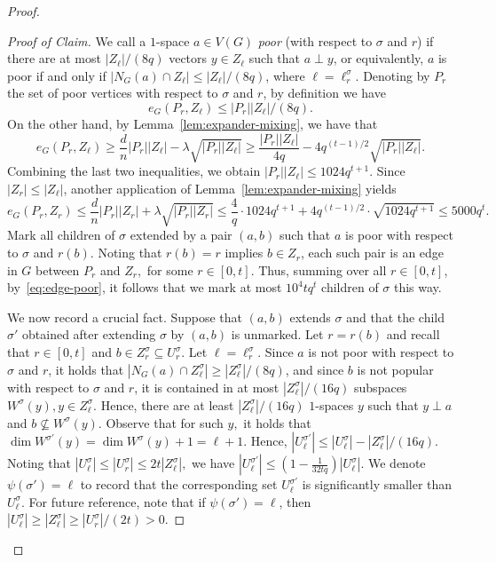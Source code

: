 \documentclass{article}
\theoremstyle{plain}
\theoremstyle{definition}
\begin{document}
\begin{proof}
\begin{proof}[Proof of Claim]
        We call a $1$-space $a \in V(G)$ \emph{poor} (with respect to $\sigma$ and $r$) if there are at most $|Z_\ell| / (8q)$ vectors $y \in Z_\ell$ such that $a \perp y$, or equivalently, $a$ is poor if and only if $|N_G(a) \cap Z_\ell | \le |Z_\ell| / (8q)$, where $\ell = \ell_r^\sigma$. Denoting by $P_r$ the set of poor vertices with respect to $\sigma$ and $r$, by definition we have 
        \begin{equation} \label{eq:eG_P_Zell}
            e_G(P_r, Z_\ell) \le |P_r| |Z_\ell| / (8q).
        \end{equation}
        On the other hand, by Lemma~\ref{lem:expander-mixing}, we have that
        \[ e_G(P_r, Z_\ell) \ge \frac{d}{n} |P_r||Z_\ell| - \lambda \sqrt{ |P_r| |Z_\ell|} \ge \frac{|P_r||Z_\ell|}{4q} - 4q^{(t-1)/2} \sqrt{|P_r||Z_\ell|} . \]
        Combining the last two inequalities, we obtain $|P_r||Z_\ell| \le 1024 q^{t+1}$. Since $|Z_r| \le |Z_\ell|$, another application of Lemma~\ref{lem:expander-mixing} yields
        \begin{equation} \label{eq:edge-poor}
            e_G(P_r, Z_r) \le \frac{d}{n} |P_r||Z_r| + \lambda \sqrt{ |P_r| |Z_r|} \le \frac{4}{q} \cdot 1024 q^{t+1} + 4 q^{(t-1)/2} \cdot \sqrt{1024 q^{t+1}}  \le 5000 q^t.
        \end{equation}
        Mark all children of $\sigma$ extended by a pair $(a, b)$ such that $a$ is poor with respect to $\sigma$ and $r(b)$. Noting that $r(b) = r$ implies $b \in Z_r$, each such pair is an edge in $G$ between $P_r$ and $Z_r,$ for some $r \in [0,t]$. Thus, summing over all $r \in [0, t]$, by~\eqref{eq:edge-poor}, it follows that we mark at most $10^4 t q^t$ children of $\sigma$ this way. 
        
        We now record a crucial fact. Suppose that $(a, b)$ extends $\sigma$ and that the child $\sigma'$ obtained after extending $\sigma$ by $(a, b)$ is unmarked. Let $r = r(b)$ and recall that $r \in [0,t]$ and $b \in Z^\sigma_r \subseteq U^\sigma_r$. Let $\ell = \ell_r^\sigma$. Since $a$ is not poor with respect to $\sigma$ and $r$, it holds that $|N_G(a) \cap Z^\sigma_\ell| \ge |Z^\sigma_\ell| / (8q)$, and since $b$ is not popular with respect to $\sigma$ and $r$, it is contained in at most $|Z^\sigma_\ell| / (16q)$ subspaces $W^\sigma(y), y \in Z^\sigma_\ell$. Hence, there are at least $|Z^\sigma_\ell| / (16q)$ $1$-spaces $y$ such that $y \perp a$ and $b \not\subseteq W^\sigma(y)$. Observe that for such $y,$ it holds that $\dim W^{\sigma'}(y) = \dim W^{\sigma}(y) + 1 = \ell + 1$. Hence, $|U_\ell^{\sigma'}| \le |U_\ell^\sigma| - |Z_{\ell}^\sigma| / (16q)$. Noting that $|U_\ell^\sigma| \le |U_r^\sigma| \le 2t |Z_\ell^\sigma|,$ we have $|U_\ell^{\sigma'}| \le \left(1 - \frac{1}{32t q} \right) |U_\ell^{\sigma}|$. We denote $\psi(\sigma') = \ell$ to record that the corresponding set $U_\ell^{\sigma'}$ is significantly smaller than $U_\ell^\sigma$. For future reference, note that if $\psi(\sigma') = \ell$, then $|U^\sigma_\ell| \ge |Z^\sigma_\ell| \ge |U^\sigma_r| / (2t) > 0$.


\end{proof}
\end{proof}
\end{document}
